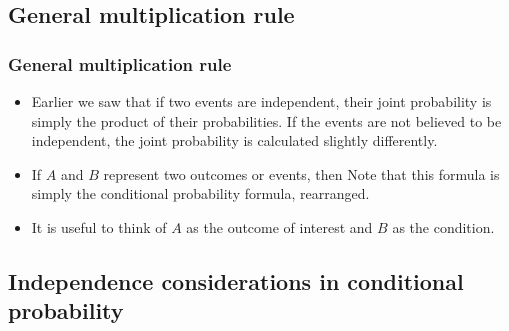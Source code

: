 \documentclass[slidestop,compress,mathserif]{beamer}
\begin{document}

\subsection{General multiplication rule}


\begin{frame}
\frametitle{General multiplication rule}

\begin{itemize}

\item Earlier we saw that if two events are independent, their joint probability is simply the product of their probabilities. If the events are not believed to be independent, the joint probability is calculated slightly differently.

\pause

\item If $A$ and $B$ represent two outcomes or events, then
\formula{\[ P(A~and~B) = P(A|B) \times P(B) \]}
Note that this formula is simply the conditional probability formula, rearranged.
\pause

\item It is useful to think of $A$ as the outcome of interest and $B$ as the condition.

\end{itemize}

\end{frame}


\subsection{Independence considerations in conditional probability}

\end{document}
